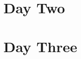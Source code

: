 \documentclass[12pt, a4paper, titlepage]{article}
\begin{document}
            
    \section{Day Two}
    
    \section{Day Three}
\end{document}
